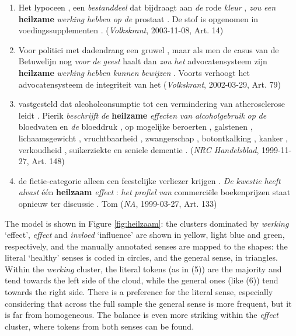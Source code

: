 \documentclass[
]{book}
\begin{document}
\begin{enumerate}
\def\labelenumi{(\arabic{enumi})}
\setcounter{enumi}{4}
\item
  Het lypoceen , een \emph{bestanddeel} dat bijdraagt aan \emph{de} rode \emph{kleur} , \emph{zou} \emph{een} \textbf{heilzame} \emph{werking} \emph{hebben} \emph{op} \emph{de} prostaat . De stof is opgenomen in voedingssupplementen . (\emph{Volkskrant}, 2003-11-08, Art. 14)
\item
  Voor politici met dadendrang een gruwel , maar als men de casus van de Betuwelijn nog \emph{voor} \emph{de} \emph{geest} haalt dan \emph{zou} \emph{het} advocatensysteem zijn \textbf{heilzame} \emph{werking} \emph{hebben} \emph{kunnen} \emph{bewijzen} . Voorts verhoogt het advocatensysteem de integriteit van het (\emph{Volkskrant}, 2002-03-29, Art. 79)
\item
  vastgesteld dat alcoholconsumptie tot een vermindering van atherosclerose leidt . Pierik \emph{beschrijft} \emph{de} \textbf{heilzame} \emph{effecten} \emph{van} \emph{alcoholgebruik} \emph{op} \emph{de} bloedvaten en \emph{de} bloeddruk , op mogelijke beroerten , galstenen , lichaamsgewicht , vruchtbaarheid , zwangerschap , botontkalking , kanker , verkoudheid , suikerziekte en seniele dementie . (\emph{NRC Handelsblad}, 1999-11-27, Art. 148)
\item
  de fictie-categorie alleen een feestelijke verliezer krijgen . \emph{De} \emph{kwestie} \emph{heeft} \emph{alvast} één \textbf{heilzaam} \emph{effect} : \emph{het} \emph{profiel} \emph{van} commerciële boekenprijzen staat opnieuw ter discussie . Tom (\emph{NA}, 1999-03-27, Art. 133)
\end{enumerate}

The model is shown in Figure \ref{fig:heilzaam}: the clusters dominated by \emph{werking} `effect', \emph{effect} and \emph{invloed} `influence' are shown in yellow, light blue and green, respectively, and the manually annotated senses are mapped to the shapes: the literal `healthy' senses is coded in circles, and the general sense, in triangles.
Within the \emph{werking} cluster, the literal tokens (as in (5)) are the majority and tend towards the left side of the cloud, while the general ones (like (6)) tend towards the right side. There is a preference for the literal sense, especially considering that across the full sample the general sense is more frequent, but it is far from homogeneous. The balance is even more striking within the \emph{effect} cluster, where tokens from both senses can be found.
\end{document}
